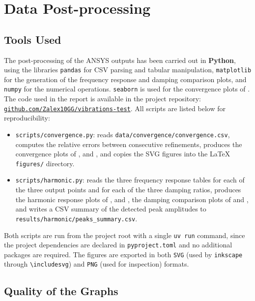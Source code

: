 \section{Data Post-processing}

\subsection{Tools Used}

The post-processing of the ANSYS outputs has been carried out in \textbf{Python}, using the libraries \texttt{pandas} for CSV parsing and tabular manipulation, \texttt{matplotlib} for the generation of the frequency response and damping comparison plots, and \texttt{numpy} for the numerical operations. \texttt{seaborn} is used for the convergence plots of . The code used in the report is available in the project repository: \href{https://github.com/Zalex10GG/vibrations-test}{\texttt{github.com/Zalex10GG/vibrations-test}}. All scripts are listed below for reproducibility:

\begin{itemize}
    \item \texttt{scripts/convergence.py}: reads \texttt{data/convergence/convergence.csv}, computes the relative errors between consecutive refinements, produces the convergence plots of ,  and , and copies the SVG figures into the LaTeX \texttt{figures/} directory.
    \item \texttt{scripts/harmonic.py}: reads the three frequency response tables for each of the three output points and for each of the three damping ratios, produces the harmonic response plots of ,  and , the damping comparison plots of  and , and writes a CSV summary of the detected peak amplitudes to \texttt{results/harmonic/peaks\_summary.csv}.
\end{itemize}

Both scripts are run from the project root with a single \texttt{uv run} command, since the project dependencies are declared in \texttt{pyproject.toml} and no additional packages are required. The figures are exported in both \texttt{SVG} (used by \texttt{inkscape} through \texttt{\textbackslash includesvg}) and \texttt{PNG} (used for inspection) formats.

\subsection{Quality of the Graphs}

